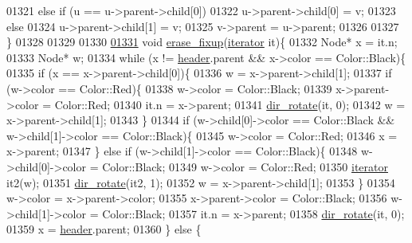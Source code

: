 \begin{DoxyCode}
01321         \textcolor{keywordflow}{else} if (u == u->parent->child[0])
01322             u->parent->child[0] = v;
01323         \textcolor{keywordflow}{else}
01324             u->parent->child[1] = v;
01325         v->parent = u->parent;
01326 
01327     \}
01328 
01329 
01330 
\hypertarget{map3_8h_source_l01331}{}\hyperlink{classaed2_1_1map_a7870c8f26e82b00d0aeb2e9f331dfec6_a7870c8f26e82b00d0aeb2e9f331dfec6}{01331} \textcolor{keywordtype}{void} \hyperlink{classaed2_1_1map_a7870c8f26e82b00d0aeb2e9f331dfec6_a7870c8f26e82b00d0aeb2e9f331dfec6}{erase_fixup}(\hyperlink{classaed2_1_1iterator}{iterator} it)\{
01332     Node* x = it.n;
01333     Node* w;
01334     \textcolor{keywordflow}{while} (x != \hyperlink{classaed2_1_1map_a92d93f905c8ad73fba18fdc7e8915cce_a92d93f905c8ad73fba18fdc7e8915cce}{header}.parent && x->color == Color::Black)\{
01335         \textcolor{keywordflow}{if} (x == x->parent->child[0])\{
01336             w = x->parent->child[1];
01337             \textcolor{keywordflow}{if} (w->color == Color::Red)\{
01338                 w->color = Color::Black;
01339                 x->parent->color = Color::Red;
01340                 it.n = x->parent;
01341                 \hyperlink{classaed2_1_1map_a94f2862ada0c9ed4f4457eac42ea8f23_a94f2862ada0c9ed4f4457eac42ea8f23}{dir_rotate}(it, 0);
01342                 w = x->parent->child[1];
01343             \}
01344             \textcolor{keywordflow}{if} (w->child[0]->color == Color::Black && w->child[1]->color == 
      Color::Black)\{
01345                 w->color = Color::Red;
01346                 x = x->parent;
01347             \} \textcolor{keywordflow}{else} \textcolor{keywordflow}{if} (w->child[1]->color == Color::Black)\{
01348                 w->child[0]->color = Color::Black;
01349                 w->color = Color::Red;
01350                 \hyperlink{classaed2_1_1iterator}{iterator} it2(w);
01351                 \hyperlink{classaed2_1_1map_a94f2862ada0c9ed4f4457eac42ea8f23_a94f2862ada0c9ed4f4457eac42ea8f23}{dir_rotate}(it2, 1);
01352                 w = x->parent->child[1];
01353             \}
01354             w->color = x->parent->color;
01355             x->parent->color = Color::Black;
01356             w->child[1]->color = Color::Black;
01357             it.n = x->parent;
01358             \hyperlink{classaed2_1_1map_a94f2862ada0c9ed4f4457eac42ea8f23_a94f2862ada0c9ed4f4457eac42ea8f23}{dir_rotate}(it, 0);
01359             x = \hyperlink{classaed2_1_1map_a92d93f905c8ad73fba18fdc7e8915cce_a92d93f905c8ad73fba18fdc7e8915cce}{header}.parent;
01360         \} \textcolor{keywordflow}{else} \{

\end{DoxyCode}

